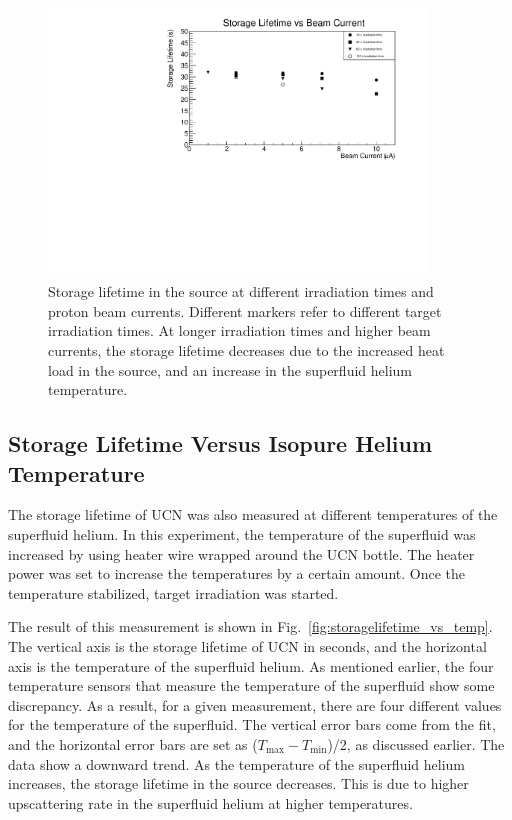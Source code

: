 \begin{figure}[h!]
  \centering
  \includegraphics[width=0.9\textwidth]{StorageLifetime_17009_and_17009A.pdf}
  \caption[UCN storage lifetime at different irradiation times and
  proton beam currents]{Storage lifetime in the source at different
    irradiation times and proton beam currents. Different markers
    refer to different target irradiation times. At longer irradiation
    times and higher beam currents, the storage lifetime decreases due
    to the increased heat load in the source, and an increase in the
    superfluid helium temperature.}
  \label{fig:storage_beam_irrad}
\end{figure}


\subsection{Storage Lifetime Versus Isopure Helium Temperature}
The storage lifetime of UCN was also measured at different
temperatures of the superfluid helium. In this experiment, the
temperature of the superfluid was increased by using heater wire
wrapped around the UCN bottle. The heater power was set to increase
the temperatures by a certain amount. Once the temperature
stabilized, target irradiation was started.

The result of this measurement is shown in
Fig.~\ref{fig:storagelifetime_vs_temp}. The vertical axis is the
storage lifetime of UCN in seconds, and the horizontal axis is the
temperature of the superfluid helium. As mentioned earlier, the four
temperature sensors that measure the temperature of the superfluid
show some discrepancy. As a result, for a given measurement, there are
four different values for the temperature of the superfluid. The
vertical error bars come from the fit, and the horizontal error bars
are set as ($T_{\mathrm{max}} - T_{\mathrm{min}}$)/2, as discussed
earlier. The data show a downward trend. As the temperature of the
superfluid helium increases, the storage lifetime in the source
decreases. This is due to higher upscattering rate in the superfluid
helium at higher temperatures.


